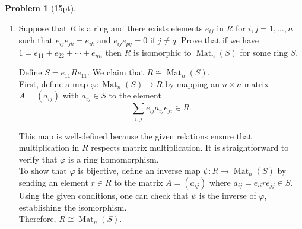 \documentclass[12pt]{article}
\theoremstyle{definition}
\newtheorem{problem}{Problem}
\DeclareMathOperator{\Mat}{Mat}
\begin{document}
\begin{problem}[15pt]
\begin{enumerate}[label=(\alph*)]
            \item Suppose that $R$ is a ring and there exists elements $e_{ij}$ in $R$ for 
            $i, j = 1, \ldots, n$ such that $e_{ij}e_{jk} = e_{ik}$ and $e_{ij}e_{pq} = 0$
            if $j \neq q$. Prove that if we have $1 = e_{11} + e_{22} + \cdots + e_{nn}$
            then $R$ is isomorphic to $\Mat_n(S)$ for some ring $S$.

            \begin{solution}
                  Define $S = e_{11} R e_{11}$. We claim that $R \cong \Mat_n(S)$. \\
                  
                  First, define a map $\varphi: \Mat_n(S) \to R$ by mapping an $n \times n$ matrix $A = (a_{ij})$ with $a_{ij} \in S$ to the element
                  \[
                        \sum_{i,j} e_{ij} a_{ij} e_{ji} \in R.
                  \]
                  
                  This map is well-defined because the given relations ensure that multiplication in $R$ respects matrix multiplication. It is straightforward to verify that $\varphi$ is a ring homomorphism. \\
                  
                  To show that $\varphi$ is bijective, define an inverse map $\psi: R \to \Mat_n(S)$ by sending an element $r \in R$ to the matrix $A = (a_{ij})$ where $a_{ij} = e_{ii} r e_{jj} \in S$. Using the given conditions, one can check that $\psi$ is the inverse of $\varphi$, establishing the isomorphism. \\
                  Therefore, $R \cong \Mat_n(S)$.
            \end{solution}
      \end{enumerate}
\end{problem}
\end{document}
